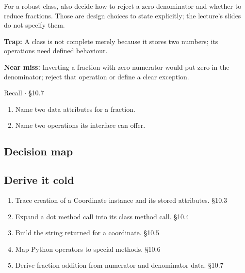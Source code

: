 \documentclass[11pt]{article}
\begin{document}
\begin{keepsection}
For a robust class, also decide how to reject a zero denominator and whether to reduce fractions. Those are design choices to state explicitly; the lecture’s slides do not specify them.

\begin{notebox}\textbf{Trap:} A class is not complete merely because it stores two numbers; its operations need defined behaviour.\end{notebox}

\begin{notebox}\textbf{Near miss:} Inverting a fraction with zero numerator would put zero in the denominator; reject that operation or define a clear exception.\end{notebox}

\begin{recallbox}{Recall \ensuremath{\cdot} §10.7}
\begin{enumerate}
\item Name two data attributes for a fraction.
\item Name two operations its interface can offer.
\end{enumerate}

\end{recallbox}
\end{keepsection}

\begin{keepsection}
\section{Decision map}
\end{keepsection}

\begin{keepsection}
\section{Derive it cold}

\begin{enumerate}
\item Trace creation of a Coordinate instance and its stored attributes. \hfill{\small\color{FAUblue}§10.3}
\item Expand a dot method call into its class method call. \hfill{\small\color{FAUblue}§10.4}
\item Build the string returned for a coordinate. \hfill{\small\color{FAUblue}§10.5}
\item Map Python operators to special methods. \hfill{\small\color{FAUblue}§10.6}
\item Derive fraction addition from numerator and denominator data. \hfill{\small\color{FAUblue}§10.7}
\end{enumerate}
\end{keepsection}
\end{document}
